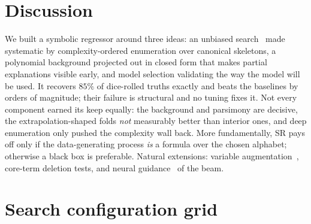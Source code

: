 \documentclass{article}
\begin{document}
\section{Discussion}
\label{sec:discussion}

We built a symbolic regressor around three ideas: an unbiased
search~\citep{Kahlmeyer} made systematic by complexity-ordered enumeration over
canonical skeletons, a polynomial background projected out in closed form that
makes partial explanations visible early, and model selection validating the way
the model will be used. It recovers $85\%$ of dice-rolled truths exactly and
beats the baselines by orders of magnitude; their failure is structural and no
tuning fixes it. Not every component earned its
keep equally: the background and parsimony are decisive, the
extrapolation-shaped folds \emph{not} measurably better than interior ones, and
deep enumeration only pushed the complexity wall back. More fundamentally, SR
pays off only if the data-generating process \emph{is} a formula over the chosen
alphabet; otherwise a black box is preferable. Natural extensions: variable
augmentation~\citep{Kahlmeyer}, core-term deletion tests, and neural
guidance~\citep{ParFam} of the beam.

\clearpage



\appendix
\section{Search configuration grid}
\label{app:hyper}

\begin{table}[H]
  \centering
  \caption{Search configurations on $48$ \emph{hard} datasets ($d{=}1$,
  $\mathcal{O}_{\mathrm{trig}}/\mathcal{O}_{\mathrm{full}}$, $4$--$8$ dice
  operators), varied one factor at a time around the default; total time is a
  configuration's cost over all $48$ datasets. The last two rows arbitrate
  between all eleven configurations \emph{per dataset}, by the cross-validated
  score $s_k$ of Section~\ref{sec:selection} resp.\ by the smallest test error
  (oracle, an upper bound), and report the selected run only. Recovery
  differences between the levels of a factor never exceed four of the $48$
  datasets, so single rows indicate trends rather than resolved effects.
  Discussed in Section~\ref{sec:experiments}.}
  \label{tab:hyper}
  \resizebox{\linewidth}{!}{}
\end{table}
\end{document}
